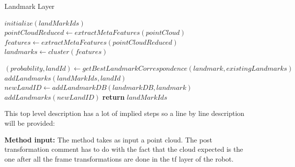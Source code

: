 \documentclass[twoside,hidelinks]{article}
\begin{document}
\begin{algorithm}
  \caption{Landmark Layer}\label{euclid}
  \begin{algorithmic}[1]
      \State $initialize(landMarkIds)$ 
      \State $pointCloudReduced \gets extractMetaFeatures(pointCloud)$ 
      \State $features \gets extractMetaFeatures(pointCloudReduced)$
      \State $landmarks \gets cluster(features)$  

	      \State $ (probability, landId) \gets getBestLandmarkCorrespondence(landmark, existingLandmarks) $
			   \State $ addLandmarks(landMarkIds, landId)$
			\Else 
			   \State $ newLandID \gets addLandmarkDB(landmarkDB, landmark)$ 
			   \State $addLandmarks(newLandID)$ 	   
			\EndIf
      \EndFor
      \State \textbf{return} $ landMarkIds$
    \EndProcedure
  \end{algorithmic}
\end{algorithm}


This top level description has a lot of implied steps so a line by line description will be provided:

\textbf{Method input:} The method takes as input a point cloud. The post transformation comment has to do with the fact that the 
cloud expected is the one after all the frame transformations are done in the tf layer of the robot.
\end{document}
